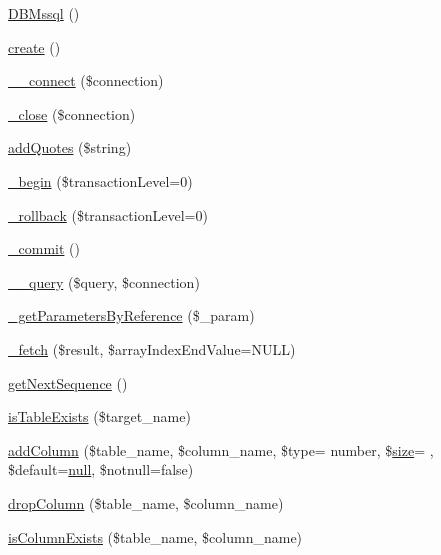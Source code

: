 \begin{DoxyCompactItemize}
\item 
\hyperlink{classDBMssql_a308e7ed895b32bedb958b2fa946fb499}{D\+B\+Mssql} ()
\item 
\hyperlink{classDBMssql_a1be3ce3432e43e0a5080ada450971345}{create} ()
\item 
\hyperlink{classDBMssql_a369f968ee79e1eb30e5d640c2294a7d1}{\+\_\+\+\_\+connect} (\$connection)
\item 
\hyperlink{classDBMssql_a64f2fc08d576cdcfc0dd3a80343a0e5a}{\+\_\+close} (\$connection)
\item 
\hyperlink{classDBMssql_ac380f1918abd17fd5cba28accfaec9fc}{add\+Quotes} (\$string)
\item 
\hyperlink{classDBMssql_ae44697dbc8dd678df78458a407e40c03}{\+\_\+begin} (\$transaction\+Level=0)
\item 
\hyperlink{classDBMssql_a35fd47dce4ad5dabbc3b994f5774afb7}{\+\_\+rollback} (\$transaction\+Level=0)
\item 
\hyperlink{classDBMssql_a08f359cc1c5ce91fde7139446252e8c4}{\+\_\+commit} ()
\item 
\hyperlink{classDBMssql_aa2d0d2f6680d70399f493b567d94ed92}{\+\_\+\+\_\+query} (\$query, \$connection)
\item 
\hyperlink{classDBMssql_a09c8011c16ac2e01c6fca9d6f0e6b7f6}{\+\_\+get\+Parameters\+By\+Reference} (\$\+\_\+param)
\item 
\hyperlink{classDBMssql_aed12cc502a2d8ee9ce8821af12d45b9e}{\+\_\+fetch} (\$result, \$array\+Index\+End\+Value=N\+U\+LL)
\item 
\hyperlink{classDBMssql_ad4342b7988253c6bbeec102b2c454659}{get\+Next\+Sequence} ()
\item 
\hyperlink{classDBMssql_add743e9c5148edf4f393209b1f4b9cd6}{is\+Table\+Exists} (\$target\+\_\+name)
\item 
\hyperlink{classDBMssql_a6f2fbcd5fea5ac36821d96cfe8f106cd}{add\+Column} (\$table\+\_\+name, \$column\+\_\+name, \$type= \textquotesingle{}number\textquotesingle{}, \$\hyperlink{jquery-1_8x_8js_afa6806c6ee5e63d5177f1dcc082ba6bc}{size}= \textquotesingle{}\textquotesingle{}, \$default=\hyperlink{modernizr_8min_8js_a286f9ec831c5e676eeb493248eab9575}{null}, \$notnull=false)
\item 
\hyperlink{classDBMssql_a802707618ed283cd4143c82972b3ade5}{drop\+Column} (\$table\+\_\+name, \$column\+\_\+name)
\item 
\hyperlink{classDBMssql_a5a96979e7fed50503b902d2983fa507a}{is\+Column\+Exists} (\$table\+\_\+name, \$column\+\_\+name)

\end{DoxyCompactItemize}
